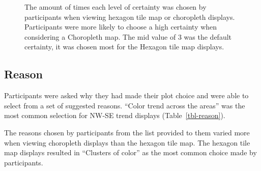 \documentclass[
doublespace,
  times]{anzsauth}
\begin{document}
\begin{figure}


\caption{\label{fig-certainty}The amount of times each level of
certainty was chosen by participants when viewing hexagon tile map or
choropleth displays. Participants were more likely to choose a high
certainty when considering a Choropleth map. The mid value of 3 was the
default certainty, it was chosen most for the Hexagon tile map
displays.}

\end{figure}%

\subsection{Reason}\label{reason}

Participants were asked why they had made their plot choice and were
able to select from a set of suggested reasons. ``Color trend across the
areas'' was the most common selection for NW-SE trend displays
(Table~\ref{tbl-reason}).

The reasons chosen by participants from the list provided to them varied
more when viewing choropleth displays than the hexagon tile map. The
hexagon tile map displays resulted in ``Clusters of color'' as the most
common choice made by participants.
\end{document}
